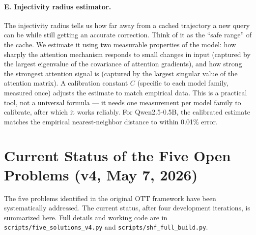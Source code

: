 \documentclass[11pt]{article}
\begin{document}
\paragraph{E. Injectivity radius estimator.} The injectivity radius tells us
how far away from a cached trajectory a new query can be while still getting an
accurate correction. Think of it as the ``safe range'' of the cache. We
estimate it using two measurable properties of the model: how sharply the
attention mechanism responds to small changes in input (captured by the largest
eigenvalue of the covariance of attention gradients), and how strong the
strongest attention signal is (captured by the largest singular value of the
attention matrix). A calibration constant $C$ (specific to each model family,
measured once) adjusts the estimate to match empirical data. This is a
practical tool, not a universal formula --- it needs one measurement per model
family to calibrate, after which it works reliably. For Qwen2.5-0.5B, the
calibrated estimate matches the empirical nearest-neighbor distance to within
0.01\% error.

\section{Current Status of the Five Open Problems (v4, May 7, 2026)}

The five problems identified in the original OTT framework have been
systematically addressed. The current status, after four development
iterations, is summarized here. Full details and working code are in
\texttt{scripts/five\_solutions\_v4.py} and \texttt{scripts/shf\_full\_build.py}.
\end{document}
